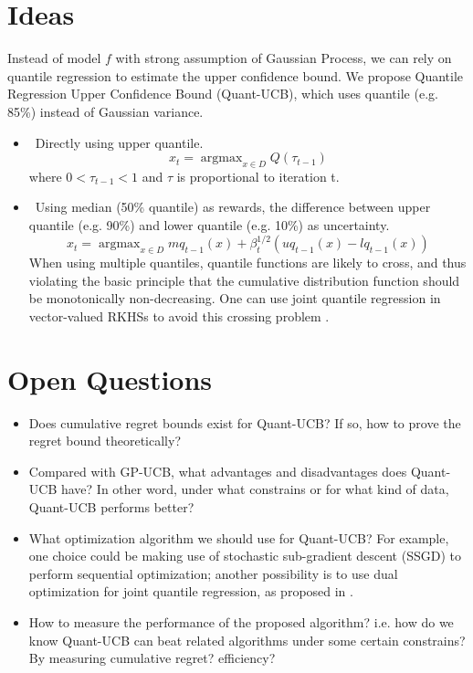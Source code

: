 \documentclass[a0,portrait]{a0poster}
\DeclareMathOperator*{\argmax}{argmax}
\newcommand{\textmoveup}{\vspace{-.5cm}}
\begin{document}
\begin{multicols}{2}
\section{Ideas}
\vspace{-.6cm}

Instead of model $f$ with strong assumption of Gaussian Process, we can rely on quantile regression to estimate the upper confidence bound. We propose Quantile Regression Upper Confidence Bound (Quant-UCB), which uses quantile (e.g. 85\%) instead of Gaussian variance. \\
 
\begin{itemize}
\item \ Directly using upper quantile. 
    $$x_t = \argmax_{x \in D} Q(\tau_{t-1})$$
    where $0 < \tau_{t-1} < 1$ and $\tau$ is proportional to iteration t.
\item \ Using median (50\% quantile) as rewards, the difference between upper quantile (e.g. 90\%) and lower quantile (e.g. 10\%) as uncertainty. 
$$x_t = \argmax_{x \in D} mq_{t-1} (x) + \beta_t^{1/2} (uq_{t-1} (x) - lq_{t-1}(x))$$
When using multiple quantiles, quantile functions are likely to cross, and thus violating the basic principle that the cumulative distribution function should be monotonically non-decreasing. One can use joint quantile regression in vector-valued RKHSs to avoid this crossing problem \cite{Sangnier:2016:JQR:3157382.3157511}. 
\end{itemize}

\section{Open Questions}
\textmoveup

\begin{itemize}
    \item Does cumulative regret bounds exist for Quant-UCB? If so, how to prove the regret bound theoretically? 
    \item Compared with GP-UCB, what advantages and disadvantages does Quant-UCB have? In other word, under what constrains or for what kind of data, Quant-UCB performs better?
    \item What optimization algorithm we should use for Quant-UCB? For example, one choice could be making use of stochastic sub-gradient descent (SSGD) to perform sequential optimization; another possibility is to use dual optimization for joint quantile regression, as proposed in \cite{Sangnier:2016:JQR:3157382.3157511}.
    \item How to measure the performance of the proposed algorithm? i.e. how do we know Quant-UCB can beat related algorithms under some certain constrains? By measuring cumulative regret? efficiency? 
\end{itemize}


\end{multicols}
\end{document}
